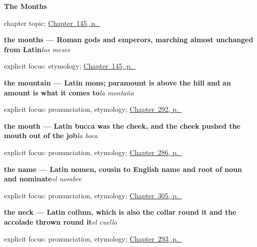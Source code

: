 \noindent\begin{minipage}[t]{\linewidth}
\raggedright
\textbf{The Months}\par
\footnotesize chapter topic; \hyperref[ch:spanish-months]{Chapter~145, p.~\pageref*{ch:spanish-months}}
\end{minipage}\par\smallskip

\noindent\begin{minipage}[t]{\linewidth}
\raggedright
\textbf{the months — Roman gods and emperors, marching almost unchanged from Latin}\enspace\emph{los meses}\par
\footnotesize explicit focus: etymology; \hyperref[ch:spanish-months]{Chapter~145, p.~\pageref*{ch:spanish-months}}
\end{minipage}\par\smallskip

\noindent\begin{minipage}[t]{\linewidth}
\raggedright
\textbf{the mountain — Latin mons; paramount is above the hill and an amount is what it comes to}\enspace\emph{la montaña}\par
\footnotesize explicit focus: pronunciation, etymology; \hyperref[ch:la-tierra]{Chapter~292, p.~\pageref*{ch:la-tierra}}
\end{minipage}\par\smallskip

\noindent\begin{minipage}[t]{\linewidth}
\raggedright
\textbf{the mouth — Latin bucca was the cheek, and the cheek pushed the mouth out of the job}\enspace\emph{la boca}\par
\footnotesize explicit focus: pronunciation, etymology; \hyperref[ch:donde-duele]{Chapter~286, p.~\pageref*{ch:donde-duele}}
\end{minipage}\par\smallskip

\noindent\begin{minipage}[t]{\linewidth}
\raggedright
\textbf{the name — Latin nomen, cousin to English name and root of noun and nominate}\enspace\emph{el nombre}\par
\footnotesize explicit focus: pronunciation, etymology; \hyperref[ch:nombre-y-apellido]{Chapter~305, p.~\pageref*{ch:nombre-y-apellido}}
\end{minipage}\par\smallskip

\noindent\begin{minipage}[t]{\linewidth}
\raggedright
\textbf{the neck — Latin collum, which is also the collar round it and the accolade thrown round it}\enspace\emph{el cuello}\par
\footnotesize explicit focus: pronunciation, etymology; \hyperref[ch:mas-del-cuerpo]{Chapter~293, p.~\pageref*{ch:mas-del-cuerpo}}
\end{minipage}\par\smallskip

